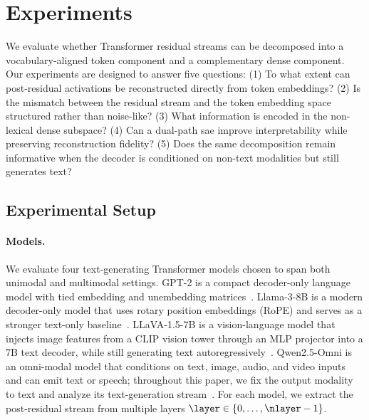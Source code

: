 \documentclass{article}
\begin{document}
\section{Experiments}
\label{sec:experiments}

We evaluate whether Transformer residual streams can be decomposed into a vocabulary-aligned token component and a complementary dense component. Our experiments are designed to answer five questions:
(1) To what extent can post-residual activations be reconstructed directly from token embeddings?
(2) Is the mismatch between the residual stream and the token embedding space structured rather than noise-like?
(3) What information is encoded in the non-lexical dense subspace?
(4) Can a dual-path \gls{sae} improve interpretability while preserving reconstruction fidelity?
(5) Does the same decomposition remain informative when the decoder is conditioned on non-text modalities but still generates text?

\subsection{Experimental Setup}
\label{subsec:exp_setup}

\paragraph{Models.}
We evaluate four text-generating Transformer models chosen to span both unimodal and multimodal settings. GPT-2 is a compact decoder-only language model with tied embedding and unembedding matrices~\cite{radfordLanguageModelsAre2019}. Llama-3-8B is a modern decoder-only model that uses rotary position embeddings (RoPE) and serves as a stronger text-only baseline~\cite{grattafioriLlama3HerdModels2024}. LLaVA-1.5-7B is a vision-language model that injects image features from a CLIP vision tower through an MLP projector into a 7B text decoder, while still generating text autoregressively~\cite{liuImprovedBaselinesVisual2024}. Qwen2.5-Omni is an omni-modal model that conditions on text, image, audio, and video inputs and can emit text or speech; throughout this paper, we fix the output modality to text and analyze its text-generation stream~\cite{xuQwen25OmniTechnicalReport2025}. For each model, we extract the post-residual stream from multiple layers $\layer \in \{0, \dots, \nlayer-1\}$.
\end{document}
